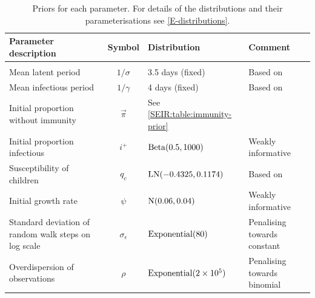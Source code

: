 \documentclass[thesis.tex]{subfiles}
\begin{document}
\begin{landscape}
\begin{table}
\begin{tabular}{l c l l}
    Parameter description & Symbol & Distribution & Comment \\
    \hline \\
    Mean latent period & $1/\sigma$ & 3.5 days (fixed) & Based on \textcite{zhaoEstimating} \\
    Mean infectious period & $1/\gamma$ & 4 days (fixed) & Based on \textcite{zhaoEstimating} \\
    Initial proportion without immunity & $\vec\pi$ & See \cref{SEIR:table:immunity-prior} & \\
    Initial proportion infectious & $i^+$ & $\operatorname{Beta}(0.5, 1000)$ & Weakly informative \\
    Susceptibility of children & $q_c$ & $\operatorname{LN}(-0.4325, 0.1174)$ & Based on \textcite{vinerTransmission}  \\
    Initial growth rate & $\psi$ & $\operatorname{N}(0.06, 0.04)$ & Weakly informative \\
    Standard deviation of random walk steps on log scale & $\sigma_\epsilon$ & $\operatorname{Exponential}(80)$ & Penalising towards constant \\
    Overdispersion of observations & $\rho$ & $\operatorname{Exponential}(2 \times 10^5)$ & Penalising towards binomial
\end{tabular}
\caption[SEIR model priors]{Priors for each parameter. For details of the distributions and their parameterisations see \cref{E-distributions}.}
\label{SEIR:table:priors}
\end{table}



\end{landscape}
\end{document}
